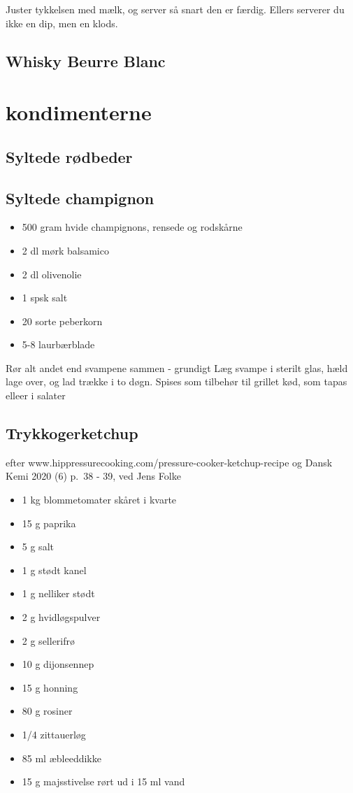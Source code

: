 \documentclass[
]{book}
\providecommand{\tightlist}{%
  \setlength{\itemsep}{0pt}\setlength{\parskip}{0pt}}
\begin{document}
Juster tykkelsen med mælk, og server så snart den er færdig. Ellers serverer du ikke en dip, men en klods.

\section{Whisky Beurre Blanc}\label{whisky-beurre-blanc}

\chapter{kondimenterne}\label{kondimenterne}

\section{Syltede rødbeder}\label{syltede-ruxf8dbeder}

\section{Syltede champignon}\label{syltede-champignon}

\begin{itemize}
\tightlist
\item
  500 gram hvide champignons, rensede og rodskårne
\item
  2 dl mørk balsamico
\item
  2 dl olivenolie
\item
  1 spsk salt
\item
  20 sorte peberkorn
\item
  5-8 laurbærblade
\end{itemize}

Rør alt andet end svampene sammen - grundigt
Læg svampe i sterilt glas, hæld lage over, og lad trække i
to døgn. Spises som tilbehør til grillet kød, som tapas elleer
i salater

\section{Trykkogerketchup}\label{trykkogerketchup}

efter www.hippressurecooking.com/pressure-cooker-ketchup-recipe
og Dansk Kemi 2020 (6) p.~38 - 39, ved Jens Folke

\begin{itemize}
\tightlist
\item
  1 kg blommetomater skåret i kvarte
\item
  15 g paprika
\item
  5 g salt
\item
  1 g stødt kanel
\item
  1 g nelliker stødt
\item
  2 g hvidløgspulver
\item
  2 g sellerifrø
\item
  10 g dijonsennep
\item
  15 g honning
\item
  80 g rosiner
\item
  1/4 zittauerløg
\item
  85 ml æbleeddikke
\item
  15 g majsstivelse rørt ud i 15 ml vand
\end{itemize}
\end{document}
